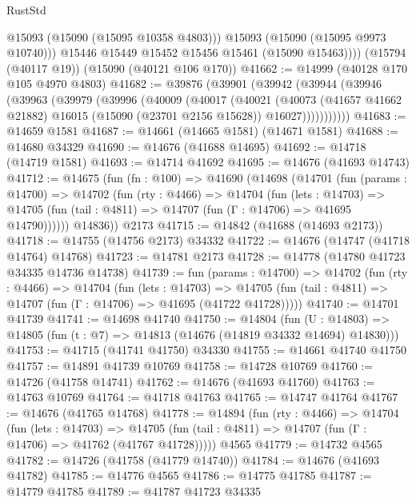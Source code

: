 \begin{lexlean}{RustStd}
\begin{coremodule}
              @15093
              (@15090 (@15095 @10358 @4803)))
            @15093
            (@15090 (@15095 @9973 @10740)))
          @15446
          @15449
          @15452
          @15456
          @15461
          (@15090 @15463))))
    (@15794 (@40117 @19))
    (@15090 (@40121 @106 @170))
@41662 := @14999 (@40128 @170 @105 @4970 @4803)
@41682 := @39876
    (@39901
      (@39942
        (@39944
          (@39946
            (@39963
              (@39979
                (@39996
                  (@40009
                    (@40017
                      (@40021
                        (@40073
                          (@41657 @41662 @21882)
                          @16015
                          (@15090 (@23701 @2156 @15628))
                          @16027)))))))))))
@41683 := @14659 @1581
@41687 := @14661 (@14665 @1581) (@14671 @1581)
@41688 := @14680 @34329
@41690 := @14676 (@41688 @14695)
@41692 := @14718 (@14719 @1581)
@41693 := @14714 @41692
@41695 := @14676 (@41693 @14743)
@41712 := @14675
    (fun (fn : @100) =>
    @41690
      (@14698
        (@14701
          (fun (params : @14700) =>
          @14702
            (fun (rty : @4466) =>
            @14704
              (fun (lets : @14703) =>
              @14705 (fun (tail : @4811) => @14707 (fun (Γ : @14706) => @41695 @14790))))))
        @14836))
    @2173
@41715 := @14842 (@41688 (@14693 @2173))
@41718 := @14755 (@14756 @2173) @34332
@41722 := @14676 (@14747 (@41718 @14764) @14768)
@41723 := @14781 @2173
@41728 := @14778 (@14780 @41723 @34335 @14736 @14738)
@41739 := fun (params : @14700) =>
  @14702
    (fun (rty : @4466) =>
    @14704
      (fun (lets : @14703) =>
      @14705 (fun (tail : @4811) => @14707 (fun (Γ : @14706) => @41695 (@41722 @41728)))))
@41740 := @14701 @41739
@41741 := @14698 @41740
@41750 := @14804
    (fun (U : @14803) => @14805 (fun (t : @7) => @14813 (@14676 (@14819 @34332 @14694) @14830)))
@41753 := @41715 (@41741 @41750) @34330
@41755 := @14661 @41740 @41750
@41757 := @14891 @41739 @10769
@41758 := @14728 @10769
@41760 := @14726 (@41758 @14741)
@41762 := @14676 (@41693 @41760)
@41763 := @14763 @10769
@41764 := @41718 @41763
@41765 := @14747 @41764
@41767 := @14676 (@41765 @14768)
@41778 := @14894
    (fun (rty : @4466) =>
    @14704
      (fun (lets : @14703) =>
      @14705 (fun (tail : @4811) => @14707 (fun (Γ : @14706) => @41762 (@41767 @41728)))))
    @4565
@41779 := @14732 @4565
@41782 := @14726 (@41758 (@41779 @14740))
@41784 := @14676 (@41693 @41782)
@41785 := @14776 @4565
@41786 := @14775 @41785
@41787 := @14779 @41785
@41789 := @41787 @41723 @34335

\end{coremodule}
\end{lexlean}
